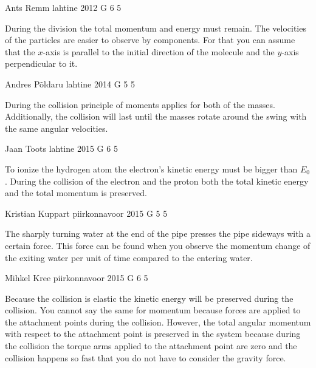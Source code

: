 \documentclass[11pt]{article}
\begin{document}
{Ants Remm} %
{lahtine} %
{2012} %
{G 6} %
{5} %
{

\ifEngHint
During the division the total momentum and energy must remain. The velocities of the particles are easier to observe by components. For that you can assume that the $x$-axis is parallel to the initial direction of the molecule and the $y$-axis perpendicular to it.
\fi
}

{Andres Põldaru} %
{lahtine} %
{2014} %
{G 5} %
{5} %
{

\ifEngHint
During the collision principle of moments applies for both of the masses. Additionally, the collision will last until the masses rotate around the swing with the same angular velocities.
\fi
}

{Jaan Toots} %
{lahtine} %
{2015} %
{G 6} %
{5} %
{

\ifEngHint
To ionize the hydrogen atom the electron’s kinetic energy must be bigger than $E_0$. During the collision of the electron and the proton both the total kinetic energy and the total momentum is preserved.
\fi
}

{Kristian Kuppart} %
{piirkonnavoor} %
{2015} %
{G 5} %
{5} %
{

\ifEngHint
The sharply turning water at the end of the pipe presses the pipe sideways with a certain force. This force can be found when you observe the momentum change of the exiting water per unit of time compared to the entering water.
\fi
}

{Mihkel Kree} %
{piirkonnavoor} %
{2015} %
{G 6} %
{5} %
{

\ifEngHint
Because the collision is elastic the kinetic energy will be preserved during the collision. You cannot say the same for momentum because forces are applied to the attachment points during the collision. However, the total angular momentum with respect to the attachment point is preserved in the system because during the collision the torque arms applied to the attachment point are zero and the collision happens so fast that you do not have to consider the gravity force.
\fi
}
\end{document}
